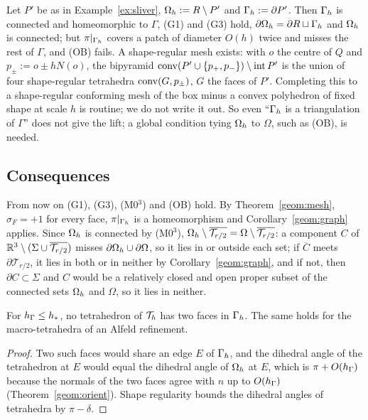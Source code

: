 \begin{example}\label{ex:filled}
Let $P'$ be as in Example~\ref{ex:sliver}, $\Omega_h:=R\setminus P'$ and $\Gamma_h:=\partial P'$. Then $\Gamma_h$ is connected and homeomorphic to $\Gamma$, (G1) and (G3) hold, $\partial\Omega_h=\partial R\sqcup\Gamma_h$ and $\Omega_h$ is connected; but $\pi|_{\Gamma_h}$ covers a patch of diameter $O(h)$ twice and misses the rest of $\Gamma$, and (OB) fails. A shape-regular mesh exists: with $o$ the centre of $Q$ and $p_\pm:=o\pm hN(o)$, the bipyramid $\operatorname{conv}(P'\cup\{p_+,p_-\})\setminus\operatorname{int}P'$ is the union of four shape-regular tetrahedra $\operatorname{conv}(G,p_\pm)$, $G$ the faces of $P'$. Completing this to a shape-regular conforming mesh of the box minus a convex polyhedron of fixed shape at scale $h$ is routine; we do not write it out. So even ``$\Gamma_h$ is a triangulation of $\Gamma$'' does not give the lift; a global condition tying $\Omega_h$ to $\Omega$, such as (OB), is needed.
\end{example}

\subsection{Consequences}
From now on (G1), (G3), (M0$^3$) and (OB) hold. By Theorem~\ref{geom:mesh}, $\sigma_F=+1$ for every face, $\pi|_{\Gamma_h}$ is a homeomorphism and Corollary~\ref{geom:graph} applies. Since $\Omega_h$ is connected by (M0$^3$), $\Omega_h\setminus\overline{\mathcal T_{r/2}}=\Omega\setminus\overline{\mathcal T_{r/2}}$: a component $C$ of $\mathbb R^3\setminus(\Sigma\cup\overline{\mathcal T_{r/2}})$ misses $\partial\Omega_h\cup\partial\Omega$, so it lies in or outside each set; if $\overline C$ meets $\partial\mathcal T_{r/2}$, it lies in both or in neither by Corollary~\ref{geom:graph}, and if not, then $\partial C\subset\Sigma$ and $C$ would be a relatively closed and open proper subset of the connected sets $\Omega_h$ and $\Omega$, so it lies in neither.

\begin{lemma}\label{geom:one}
For $h_\Gamma\le h_\ast$, no tetrahedron of $\mathcal T_h$ has two faces in $\Gamma_h$. The same holds for the macro-tetrahedra of an Alfeld refinement.
\end{lemma}

\begin{proof}
Two such faces would share an edge $E$ of $\Gamma_h$, and the dihedral angle of the tetrahedron at $E$ would equal the dihedral angle of $\Omega_h$ at $E$, which is $\pi+O(h_\Gamma)$ because the normals of the two faces agree with $n$ up to $O(h_\Gamma)$ (Theorem~\ref{geom:orient}). Shape regularity bounds the dihedral angles of tetrahedra by $\pi-\delta$.
\end{proof}

